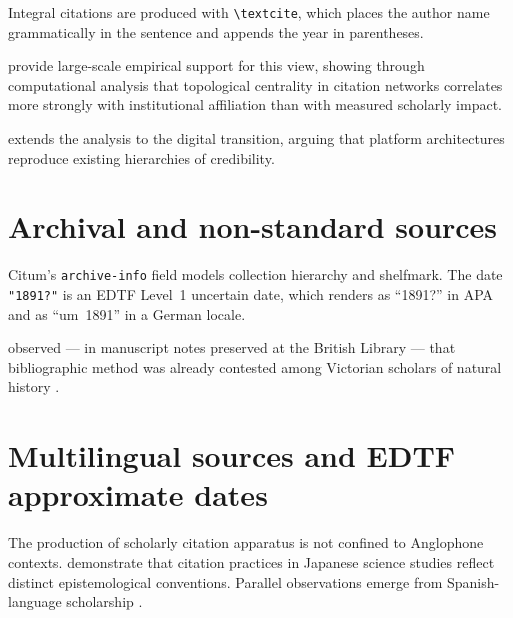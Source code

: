 \documentclass{article}
\begin{document}
Integral citations are produced with \verb|\textcite|, which places the
author name grammatically in the sentence and appends the year in parentheses.

\textcite{okafor2024} provide large-scale empirical support for this view,
showing through computational analysis that topological centrality in citation
networks correlates more strongly with institutional affiliation than with
measured scholarly impact.

\textcite[ch.~2]{chen2020} extends the analysis to the digital transition,
arguing that platform architectures reproduce existing hierarchies of
credibility.

\section{Archival and non-standard sources}

Citum's \texttt{archive-info} field models collection hierarchy and shelfmark.
The date \texttt{"1891?"} is an EDTF Level~1 uncertain date, which renders
as ``1891?'' in APA and as ``um~1891'' in a German locale.

\textcite{harrington1891} observed --- in manuscript notes preserved at the
British Library --- that bibliographic method was already contested among
Victorian scholars of natural history \cite[ff.~12--15]{harrington1891}.

\section{Multilingual sources and EDTF approximate dates}

The production of scholarly citation apparatus is not confined to Anglophone
contexts.
\textcite{tanaka_yuki2019} demonstrate that citation practices in Japanese
science studies reflect distinct epistemological conventions.
Parallel observations emerge from Spanish-language scholarship
\cite{garcia2022}.
\end{document}
